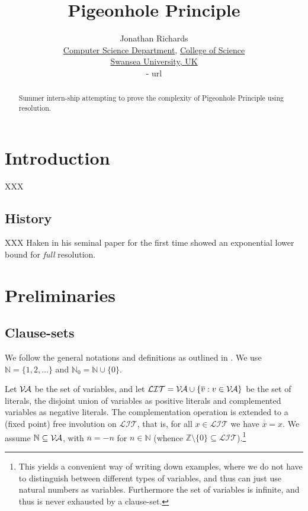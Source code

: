 \documentclass{report}
\newcommand{\set}[1]{\{ #1 \}}
\newcommand{\ol}{\overline}
\newcommand{\sm}{\setminus}
\newcommand{\sse}{\subseteq}
\newcommand{\mc}{\mathcal}
\newcommand{\ZZ}{\mathbb{Z}}
\newcommand{\NN}{\mathbb{N}}
\newcommand{\NNZ}{\NN_0}
\newcommand{\Va}{\mc{V\hspace{-0.1em}A}}
\newcommand{\Lit}{\mc{LIT}}
\begin{document}
\title{Pigeonhole Principle}

\author{
  Jonathan Richards\\
  \href{http://www.swan.ac.uk/compsci/}{Computer Science Department}, \href{http://www.swan.ac.uk/science/}{College of Science}\\
  \href{http://www.swan.ac.uk/}{Swansea University, UK}\\
  {- url}
}

\maketitle

\begin{abstract}
Summer intern-ship attempting to prove the complexity of Pigeonhole Principle using resolution. 
\end{abstract}

\tableofcontents

\chapter{Introduction}
\label{cha:Introduction}

XXX

\section{History}
\label{sec:History}

XXX Haken in his seminal paper \cite{Haken1985Intractability} for the first time showed an exponential lower bound for \emph{full} resolution.



\chapter{Preliminaries}
\label{cha:Preliminaries}

\section{Clause-sets}
\label{clause-sets}

We follow the general notations and definitions as outlined in \cite{Kullmann2007HandbuchMU}. We use $\NN = \set{1,2,\dots}$ and $\NNZ = \NN \cup \set{0}$.

Let $\Va$ be the set of variables, and let $\Lit = \Va \cup \set{\ol{v} : v \in \Va}$ be the set of literals, the disjoint union of variables as positive literals and complemented variables as negative literals. The complementation operation is extended to a (fixed point) free involution on $\Lit$, that is, for all $x \in \Lit$ we have $\ol{\ol{x}} = x$. We assume $\NN \sse \Va$, with $\ol{n} = -n$ for $n \in \NN$ (whence $\ZZ \sm \set{0} \sse \Lit$).\footnote{This yields a convenient way of writing down examples, where we do not have to distinguish between different types of variables, and thus can just use natural numbers as variables. Furthermore the set of variables is infinite, and thus is never exhausted by a clause-set.}
\end{document}
